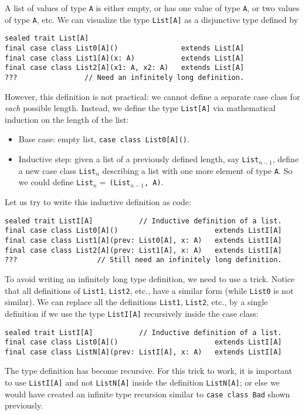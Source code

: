 A list of values of type \lstinline!A! is either empty, or has one
value of type \lstinline!A!, or two values of type \lstinline!A!,
etc. We can visualize the type \lstinline!List[A]! as a disjunctive
type defined by
\begin{lstlisting}
sealed trait List[A]
final case class List0[A]()               extends List[A]
final case class List1[A](x: A)           extends List[A]
final case class List2[A](x1: A, x2: A)   extends List[A]
???                // Need an infinitely long definition.
\end{lstlisting}
However, this definition is not practical: we cannot define a separate
case class for \emph{each} possible length. Instead, we define the
type \lstinline!List[A]! via mathematical induction on the length
of the list:
\begin{itemize}
\item Base case: empty list, \lstinline!case class List0[A]()!.
\item Inductive step: given a list of a previously defined length, say \lstinline!List!$_{n-1}$,
define a new case class \lstinline!List!$_{n}$ describing a list
with one more element of type \lstinline!A!. So we could define \lstinline!List!$_{n}=\,$\lstinline!(List!$_{n-1}$\lstinline!, A)!.
\end{itemize}
Let us try to write this inductive definition as code:
\begin{lstlisting}
sealed trait ListI[A]           // Inductive definition of a list.
final case class List0[A]()                       extends ListI[A]
final case class List1[A](prev: List0[A], x: A)   extends ListI[A]
final case class List2[A](prev: List1[A], x: A)   extends ListI[A]
???                   // Still need an infinitely long definition.
\end{lstlisting}
To avoid writing an infinitely long type definition, we need to use
a trick. Notice that all definitions of \lstinline!List1!, \lstinline!List2!,
etc., have a similar form (while \lstinline!List0! is not similar).
We can replace all the definitions \lstinline!List1!, \lstinline!List2!,
etc., by a single definition if we use the type \lstinline!ListI[A]!
recursively inside the case class:
\begin{lstlisting}
sealed trait ListI[A]           // Inductive definition of a list.
final case class List0[A]()                       extends ListI[A]
final case class ListN[A](prev: ListI[A], x: A)   extends ListI[A]
\end{lstlisting}
The type definition has become recursive. For this trick to work,
it is important to use \lstinline!ListI[A]! and not \lstinline!ListN[A]!
inside the definition \lstinline!ListN[A]!; or else we would have
created an infinite type recursion
similar to \lstinline!case class Bad! shown previously.


